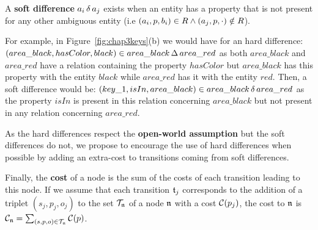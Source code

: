 \documentclass[a4paper,11pt,twoside]{StyleThese}
\begin{document}
\begin{definition}
A \textbf{soft difference} $a_i \,\delta\, a_j$ exists when an entity has a property that is not present for any other ambiguous entity (i.e $(a_i, p, b_i) \in R \land (a_j, p, \cdot) \notin R$).
\end{definition}

For example, in Figure~\ref{fig:chap3keys}(b) we would have for an hard difference: $(area\_black, hasColor, black) \in area\_black \,\Delta\, area\_red$ as both $area\_black$ and $area\_red$ have a relation containing the property $hasColor$ but $area\_black$ has this property with the entity $black$ while $area\_red$ has it with the entity $red$. Then, a soft difference would be: $(key\_1, isIn, area\_black) \in area\_black \,\delta\, area\_red$ as the property $isIn$ is present in this relation concerning $area\_black$ but not present in any relation concerning $area\_red$.

As the hard differences respect the \textbf{open-world assumption} but the soft differences do not, we propose to encourage the use of hard differences when possible by adding an extra-cost to transitions coming from soft differences.

Finally, the \textbf{cost} of a node is the sum of the costs of each transition leading to this node. If we assume that each transition $\mathfrak{t}_j$ corresponds to the addition of a triplet $(s_j, p_j, o_j)$ to the set $\mathcal{T}_{\mathfrak{n}}$ of a node $\mathfrak{n}$ with a cost $\mathcal{C}(p_j)$, the cost to $\mathfrak{n}$ is $\mathcal{C}_{\mathfrak{n}} = \sum_{(s, p, o) \in \mathcal{T}_{\mathfrak{n}}} \mathcal{C}(p)$. 
\end{document}
